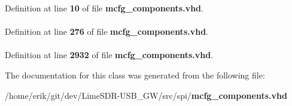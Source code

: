 Definition at line {\bf 10} of file {\bf mcfg\+\_\+components.\+vhd}.

\paragraph[{topcfg}]{ {\bfseries \textcolor{vhdlchar}{ }} \hspace{0.3cm}{\ttfamily [Component]}}\label{classmcfg__components_ab7acdb93280fddf33d1253040d280861}


Definition at line {\bf 276} of file {\bf mcfg\+\_\+components.\+vhd}.

\paragraph[{txtspcfg}]{ {\bfseries \textcolor{vhdlchar}{ }} \hspace{0.3cm}{\ttfamily [Component]}}\label{classmcfg__components_ac715139da2a5b2fab77b717927e16737}


Definition at line {\bf 2932} of file {\bf mcfg\+\_\+components.\+vhd}.



The documentation for this class was generated from the following file\+:\begin{DoxyCompactItemize}
\item 
/home/erik/git/dev/\+Lime\+S\+D\+R-\/\+U\+S\+B\+\_\+\+G\+W/src/spi/{\bf mcfg\+\_\+components.\+vhd}\end{DoxyCompactItemize}
